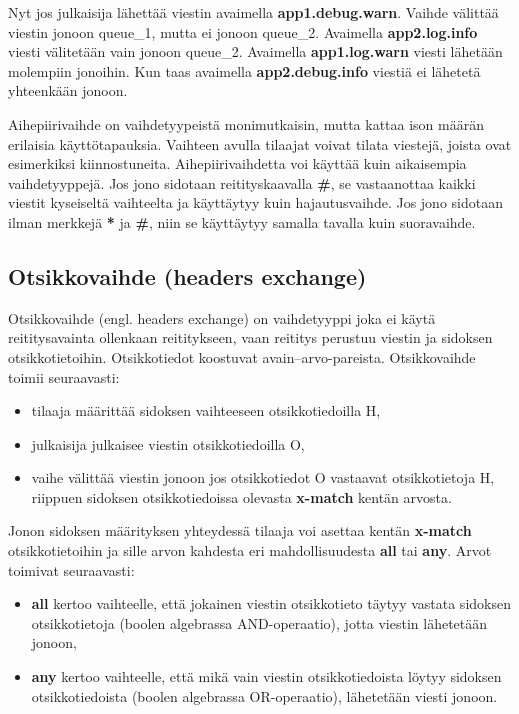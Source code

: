 Nyt jos julkaisija lähettää viestin avaimella \textbf{app1.debug.warn}. Vaihde välittää viestin jonoon queue\_1, mutta ei jonoon queue\_2. Avaimella \textbf{app2.log.info} viesti välitetään vain jonoon queue\_2. Avaimella \textbf{app1.log.warn} viesti lähetään molempiin jonoihin. Kun taas avaimella \textbf{app2.debug.info} viestiä ei lähetetä yhteenkään jonoon.

Aihepiirivaihde on vaihdetyypeistä monimutkaisin, mutta kattaa ison määrän erilaisia käyttötapauksia. Vaihteen avulla tilaajat voivat tilata viestejä, joista ovat esimerkiksi kiinnostuneita. Aihepiirivaihdetta voi käyttää kuin aikaisempia vaihdetyyppejä. Jos jono sidotaan reitityskaavalla \textbf{\#}, se vastaanottaa kaikki viestit kyseiseltä vaihteelta ja käyttäytyy kuin hajautusvaihde. Jos jono sidotaan ilman merkkejä \textbf{*} ja \textbf{\#}, niin se käyttäytyy samalla tavalla kuin suoravaihde. \cite{RabbitMQ-Tutorial-Topics}


\subsection{Otsikkovaihde (headers exchange)}
Otsikkovaihde (engl. headers exchange) on vaihdetyyppi joka ei käytä reititysavainta ollenkaan reititykseen, vaan reititys perustuu viestin ja sidoksen otsikkotietoihin. Otsikkotiedot koostuvat avain--arvo-pareista. Otsikkovaihde toimii seuraavasti:
\begin{itemize}
	\item tilaaja määrittää sidoksen vaihteeseen otsikkotiedoilla H,
	\item julkaisija julkaisee viestin otsikkotiedoilla O,
	\item vaihe välittää viestin jonoon jos otsikkotiedot O vastaavat otsikkotietoja H, riippuen sidoksen otsikkotiedoissa olevasta \textbf{x-match} kentän arvosta.
\end{itemize}
Jonon sidoksen määrityksen yhteydessä tilaaja voi asettaa kentän \textbf{x-match} otsikkotietoihin ja sille arvon kahdesta eri mahdollisuudesta \textbf{all} tai \textbf{any}. Arvot toimivat seuraavasti:
\begin{itemize}
	\item \textbf{all} kertoo vaihteelle, että jokainen viestin otsikkotieto täytyy vastata sidoksen otsikkotietoja (boolen algebrassa AND-operaatio), jotta viestin lähetetään jonoon,
	\item \textbf{any} kertoo vaihteelle, että mikä vain viestin otsikkotiedoista löytyy sidoksen otsikkotiedoista (boolen algebrassa OR-operaatio), lähetetään viesti jonoon. \cite[s.~28]{AMQP-specification}
\end{itemize}

